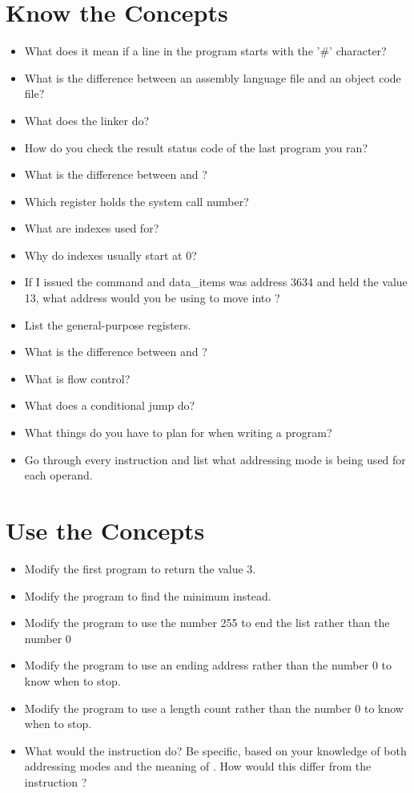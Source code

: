 \section{Know the Concepts}

\begin{itemize}\item What does it mean if a line in the program starts with the '\#' character? 
\item What is the difference between an assembly language file and an object code file? 
\item What does the linker do? 
\item How do you check the result status code of the last program you ran? 
\item What is the difference between  and ? 
\item Which register holds the system call number? 
\item What are indexes used for? 
\item Why do indexes usually start at 0? 
\item If I issued the command  and data\_items was address 3634 and {\ediReg} held the value 13, what address would you be using to move into {\eaxReg}? 
\item List the general-purpose registers. 
\item What is the difference between  and ? 
\item What is flow control? 
\item What does a conditional jump do? 
\item What things do you have to plan for when writing a program? 
\item Go through every instruction and list what addressing mode is being used for each operand. 
\end{itemize}

\section{Use the Concepts}

\begin{itemize}\item Modify the first program to return the value 3. 
\item Modify the  program to find the minimum instead. 
\item Modify the  program to use the number 255 to end the list rather than the number 0 
\item Modify the  program to use an ending address rather than the number 0 to know when to stop. 
\item Modify the  program to use a length count rather than the number 0 to know when to stop. 
\item What would the instruction  do?  Be specific, based on your knowledge of both addressing modes and the meaning of .  How would this differ from the instruction ? 
\end{itemize}

